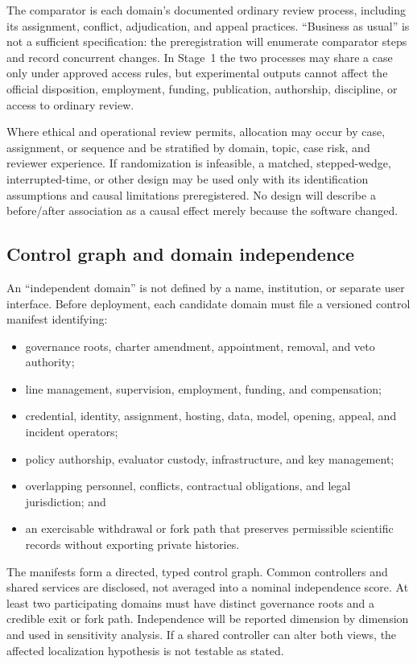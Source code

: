 \documentclass[11pt]{article}
\begin{document}
The comparator is each domain's documented ordinary review process, including its
assignment, conflict, adjudication, and appeal practices. ``Business as usual'' is
not a sufficient specification: the preregistration will enumerate comparator
steps and record concurrent changes. In Stage~1 the two processes may share a case
only under approved access rules, but experimental outputs cannot affect the
official disposition, employment, funding, publication, authorship, discipline, or
access to ordinary review.

Where ethical and operational review permits, allocation may occur by case,
assignment, or sequence and be stratified by domain, topic, case risk, and reviewer
experience. If randomization is infeasible, a matched, stepped-wedge,
interrupted-time, or other design may be used only with its identification
assumptions and causal limitations preregistered. No design will describe a
before/after association as a causal effect merely because the software changed.

\subsection{Control graph and domain independence}

An ``independent domain'' is not defined by a name, institution, or separate user
interface. Before deployment, each candidate domain must file a versioned control
manifest identifying:

\begin{itemize}
  \item governance roots, charter amendment, appointment, removal, and veto
  authority;
  \item line management, supervision, employment, funding, and compensation;
  \item credential, identity, assignment, hosting, data, model, opening, appeal,
  and incident operators;
  \item policy authorship, evaluator custody, infrastructure, and key management;
  \item overlapping personnel, conflicts, contractual obligations, and legal
  jurisdiction; and
  \item an exercisable withdrawal or fork path that preserves permissible
  scientific records without exporting private histories.
\end{itemize}

The manifests form a directed, typed control graph. Common controllers and shared
services are disclosed, not averaged into a nominal independence score. At least
two participating domains must have distinct governance roots and a credible exit
or fork path. Independence will be reported dimension by dimension and used in
sensitivity analysis. If a shared controller can alter both views, the affected
localization hypothesis is not testable as stated.
\end{document}
